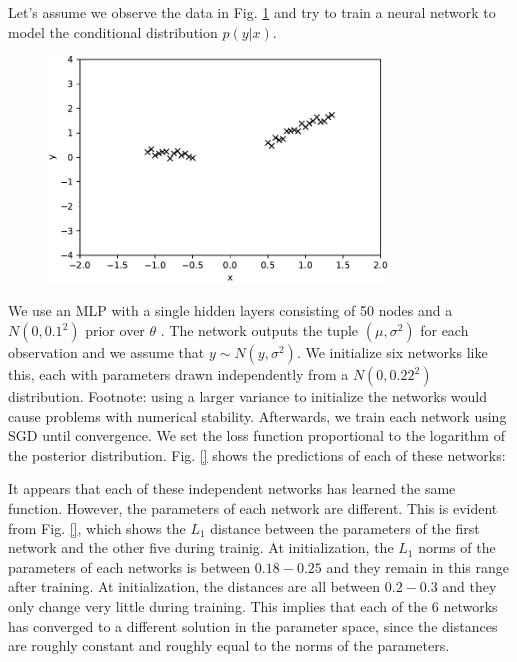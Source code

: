 \documentclass[12pt]{article}
\begin{document}
Let's assume we observe the data in Fig. \ref{fig_1d_dataset} and try to train a neural network to model the conditional distribution $p(y | x)$.

\begin{figure}[h]
\centering
\includegraphics[width=9cm]{plots/1d_dataset.pdf}
\caption{}
\label{fig_1d_dataset}
\end{figure}

We use an MLP with a single hidden layers consisting of 50 nodes and a $N(0, 0.1^2)$ prior over $\theta$ . The network outputs the tuple $(\mu, \sigma^2)$ for each observation and we assume that $y \sim N(y, \sigma^2)$. We initialize six networks like this, each with parameters drawn independently from a $N(0, 0.22^2)$ distribution. Footnote: using a larger variance to initialize the networks would cause problems with numerical stability. Afterwards, we train each network using SGD until convergence. We set the loss function proportional to the logarithm of the posterior distribution. Fig. \ref{} shows the predictions of each of these networks:

\begin{figure}[h]
\centering
{}
\caption{}
\label{fig_1d_ens_predictions}
\end{figure}

It appears that each of these independent networks has learned the same function. However, the parameters of each network are different. This is evident from Fig. \ref{}, which shows the $L_1$ distance between the parameters of the first network and the other five during trainig. At initialization, the $L_1$ norms of the parameters of each networks is between $0.18 - 0.25$ and they remain in this range after training. At initialization, the distances are all between $0.2 - 0.3$ and they only change very little during training. This implies that each of the 6 networks has converged to a different solution in the parameter space, since the distances are roughly constant and roughly equal to the norms of the parameters.
\end{document}
